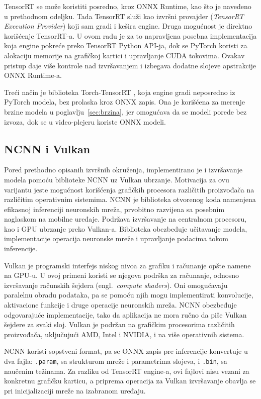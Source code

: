 \documentclass[12pt,a4paper]{article}
\begin{document}
TensorRT se može koristiti posredno, kroz ONNX Runtime, kao što je navedeno u prethodnom odeljku. Tada TensorRT služi kao izvršni provajder (\textit{TensorRT Execution Provider}) koji sam gradi i kešira engine. Druga mogućnost je direktno korišćenje TensorRT-a. U ovom radu je za to napravljena posebna implementacija koja engine pokreće preko TensorRT Python API-ja, dok se PyTorch koristi za alokaciju memorije na grafičkoj kartici i upravljanje CUDA tokovima. Ovakav pristup daje više kontrole nad izvršavanjem i izbegava dodatne slojeve apstrakcije ONNX Runtime-a.

Treći način je biblioteka Torch-TensorRT \cite{TorchTensorRT}, koja engine gradi neposredno iz PyTorch modela, bez prolaska kroz ONNX zapis. Ona je korišćena za merenje brzine modela u poglavlju~\ref{sec:brzina}, jer omogućava da se modeli porede bez izvoza, dok se u video-plejeru koriste ONNX modeli.

\subsection{NCNN i Vulkan}

Pored prethodno opisanih izvršnih okruženja, implementirano je i izvršavanje modela pomoću biblioteke NCNN \cite{ncnn} uz Vulkan ubrzanje. Motivacija za ovu varijantu jeste mogućnost korišćenja grafičkih procesora različitih proizvođača na različitim operativnim sistemima. NCNN je biblioteka otvorenog koda namenjena efikasnoj inferenciji neuronskih mreža, prvobitno razvijena sa posebnim naglaskom na mobilne uređaje. Podržava izvršavanje na centralnom procesoru, kao i GPU ubrzanje preko Vulkan-a. Biblioteka obezbeđuje učitavanje modela, implementacije operacija neuronske mreže i upravljanje podacima tokom inferencije.

Vulkan \cite{Vulkan} je programski interfejs niskog nivoa za grafiku i računanje opšte namene na GPU-u. U ovoj primeni koristi se njegova podrška za računanje, odnosno izvršavanje računskih šejdera (engl.\ \textit{compute shaders}). Oni omogućavaju paralelnu obradu podataka, pa se pomoću njih mogu implementirati konvolucije, aktivacione funkcije i druge operacije neuronskih mreža. NCNN obezbeđuje odgovarajuće implementacije, tako da aplikacija ne mora ručno da piše Vulkan šejdere za svaki sloj. Vulkan je podržan na grafičkim procesorima različitih proizvođača, uključujući AMD, Intel i NVIDIA, i na više operativnih sistema.

NCNN koristi sopstveni format, pa se ONNX zapis pre inferencije konvertuje u dva fajla: \texttt{.param}, sa strukturom mreže i parametrima slojeva, i \texttt{.bin}, sa naučenim težinama. Za razliku od TensorRT engine-a, ovi fajlovi nisu vezani za konkretnu grafičku karticu, a priprema operacija za Vulkan izvršavanje obavlja se pri inicijalizaciji mreže na izabranom uređaju.
\end{document}
